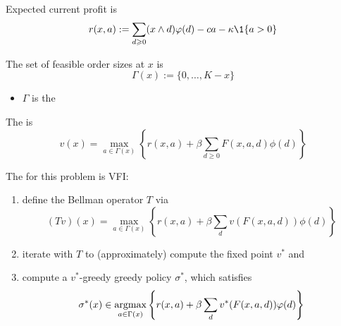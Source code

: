 \begin{frame}
    
    Expected current profit is
    \begin{equation*}
        r(x, a)  := \sum_{d \geq 0} (x \wedge d) \phi(d) 
            - c a - \kappa \1\{a > 0\}
    \end{equation*}

    \vspace{0.5em}
    \vspace{0.5em}
    The set of feasible order sizes
    at $x$ is 
    \begin{equation*}
        \Gamma(x) := \{0, \ldots, K - x\}
    \end{equation*}
    \vspace{-1.5em}
    \begin{itemize}
        \item $\Gamma$ is the 
    \end{itemize}

    \vspace{0.5em}
    The  is
    \begin{equation*}
        v(x)
        = \max_{a \in \Gamma(x)} 
        \left\{
            r(x, a)
            + \beta
            \sum_{d \geq 0} F(x, a, d) \phi(d)
        \right\}
    \end{equation*}

\end{frame}

\begin{frame}
    
    The  for this problem is VFI:

    \begin{enumerate}
        \item define the Bellman operator $T$ via
            \begin{equation*}
                (Tv)(x)
                = \max_{a \in \Gamma(x)} 
                \left\{
                    r(x, a)
                    + \beta
                    \sum_{d } v(F(x,a,d)) \phi(d)
                \right\}
            \end{equation*}
            \vspace{0.5em}
        \item iterate with $T$ to (approximately) compute the
            fixed point $v^*$ and
            \vspace{0.5em}
        \item compute a $v^*$-greedy greedy policy $\sigma^*$, which satisfies
            \begin{equation*}
                \sigma^*(x)
                \in \argmax_{a \in \Gamma(x)} 
                \left\{
                    r(x, a)
                    + \beta
                    \sum_{d } v^*(F(x,a,d)) \phi(d)
                \right\}
            \end{equation*}
    \end{enumerate}

\end{frame}



